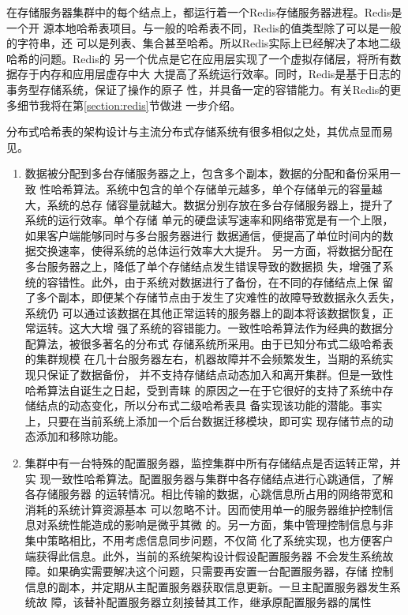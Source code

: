 在存储服务器集群中的每个结点上，都运行着一个Redis存储服务器进程。Redis是一个开
源本地哈希表项目。与一般的哈希表不同，Redis的值类型除了可以是一般的字符串，还
可以是列表、集合甚至哈希。所以Redis实际上已经解决了本地二级哈希的问题。Redis的
另一个优点是它在应用层实现了一个虚拟存储层，将所有数据存于内存和应用层虚存中大
大提高了系统运行效率。同时，Redis是基于日志的事务型存储系统，保证了操作的原子
性，并具备一定的容错能力。有关Redis的更多细节我将在第\ref{section:redis}节做进
一步介绍。

分布式哈希表的架构设计与主流分布式存储系统有很多相似之处，其优点显而易见。
\begin{enumerate}
  \item 数据被分配到多台存储服务器之上，包含多个副本，数据的分配和备份采用一致
  性哈希算法。系统中包含的单个存储单元越多，单个存储单元的容量越大，系统的总存
  储容量就越大。数据分别存放在多台存储服务器上，提升了系统的运行效率。单个存储
  单元的硬盘读写速率和网络带宽是有一个上限，如果客户端能够同时与多台服务器进行
  数据通信，便提高了单位时间内的数据交换速率，使得系统的总体运行效率大大提升。
  另一方面，将数据分配在多台服务器之上，降低了单个存储结点发生错误导致的数据损
  失，增强了系统的容错性。此外，由于系统对数据进行了备份，在不同的存储结点上保
  留了多个副本，即便某个存储节点由于发生了灾难性的故障导致数据永久丢失，系统仍
  可以通过该数据在其他正常运转的服务器上的副本将该数据恢复，正常运转。这大大增
  强了系统的容错能力。一致性哈希算法作为经典的数据分配算法，被很多著名的分布式
  存储系统所采用。\cite{hastorun2007dynamo}由于已知分布式二级哈希表的集群规模
  在几十台服务器左右，机器故障并不会频繁发生，当期的系统实现只保证了数据备份，
  并不支持存储结点动态加入和离开集群。但是一致性哈希算法自诞生之日起，受到青睐
  的原因之一在于它很好的支持了系统中存储结点的动态变化，所以分布式二级哈希表具
  备实现该功能的潜能。事实上，只要在当前系统上添加一个后台数据迁移模块，即可实
  现存储节点的动态添加和移除功能。
  \item 集群中有一台特殊的配置服务器，监控集群中所有存储结点是否运转正常，并实
  现一致性哈希算法。配置服务器与集群中各存储结点进行心跳通信，了解各存储服务器
  的运转情况。相比传输的数据，心跳信息所占用的网络带宽和消耗的系统计算资源基本
  可以忽略不计。因而使用单一的服务器维护控制信息对系统性能造成的影响是微乎其微
  的。另一方面，集中管理控制信息与非集中策略相比，不用考虑信息同步问题，不仅简
  化了系统实现，也方便客户端获得此信息。此外，当前的系统架构设计假设配置服务器
  不会发生系统故障。如果确实需要解决这个问题，只需要再安置一台配置服务器，存储
  控制信息的副本，并定期从主配置服务器获取信息更新。一旦主配置服务器发生系统故
  障，该替补配置服务器立刻接替其工作，继承原配置服务器的属性

\end{enumerate}
